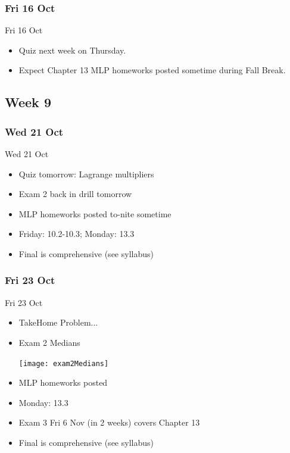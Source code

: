 \documentclass[12pt]{beamer}
\theoremstyle{plain}
\theoremstyle{definition}
\begin{document}
\subsubsection{Fri 16 Oct}
\begin{frame}{Fri 16 Oct}%
\begin{itemize}
\item Quiz next week on Thursday.
\item Expect Chapter 13 MLP homeworks posted sometime during Fall Break.
\end{itemize}
\end{frame}

\subsection{Week 9}
\subsubsection{Wed 21 Oct}
\begin{frame}{Wed 21 Oct}%
\begin{itemize}
\item Quiz tomorrow: Lagrange multipliers
\item Exam 2 back in drill tomorrow
\item MLP homeworks posted to-nite sometime
\item Friday: 10.2-10.3; Monday: 13.3
\item Final is comprehensive (see syllabus)
\end{itemize}
\end{frame}

\subsubsection{Fri 23 Oct}
\begin{frame}{Fri 23 Oct}%
\begin{itemize}
\item TakeHome Problem...
\item Exam 2 Medians
	\begin{center}
	\texttt{[image: exam2Medians]}
	\end{center}
\item MLP homeworks posted 
\item Monday: 13.3
\item Exam 3 Fri 6 Nov (in 2 weeks) covers Chapter 13
\item Final is comprehensive (see syllabus)
\end{itemize}
\end{frame}
\end{document}
